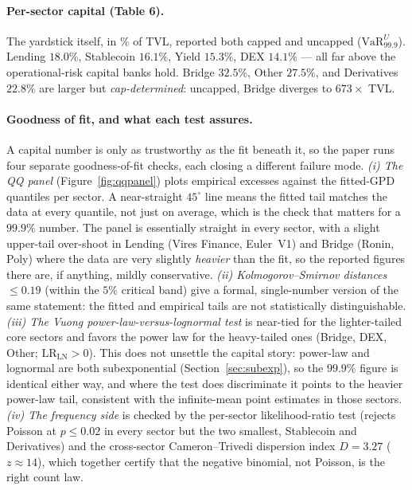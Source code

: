 \documentclass[11pt]{article}
\theoremstyle{definition}
\theoremstyle{remark}
\theoremstyle{definition}
\newcommand{\VaR}{\mathrm{VaR}}
\newcommand{\1}{\mathbf{1}}
\begin{document}
\paragraph{Per-sector capital (Table 6).}
The yardstick itself, in \% of TVL, reported both capped and uncapped
($\VaR_{99.9}^{U}$). Lending $18.0\%$, Stablecoin $16.1\%$, Yield $15.3\%$,
DEX $14.1\%$ --- all far above the operational-risk capital banks hold. Bridge
$32.5\%$, Other $27.5\%$, and Derivatives $22.8\%$ are larger but
\emph{cap-determined}: uncapped, Bridge diverges to $673\times$ TVL.

\paragraph{Goodness of fit, and what each test assures.}
A capital number is only as trustworthy as the fit beneath it, so the paper runs
four separate goodness-of-fit checks, each closing a different failure mode.
\emph{(i) The QQ panel} (Figure~\ref{fig:qqpanel}) plots empirical excesses
against the fitted-GPD quantiles per sector. A near-straight $45^\circ$ line
means the fitted tail matches the data at every quantile, not just on average,
which is the check that matters for a $99.9\%$ number. The panel is essentially
straight in every sector, with a slight upper-tail over-shoot in Lending (Vires
Finance, Euler~V1) and Bridge (Ronin, Poly) where the data are very slightly
\emph{heavier} than the fit, so the reported figures there are, if anything,
mildly conservative. \emph{(ii) Kolmogorov--Smirnov distances} $\le 0.19$ (within
the $5\%$ critical band) give a formal, single-number version of the same
statement: the fitted and empirical tails are not statistically distinguishable.
\emph{(iii) The Vuong power-law-versus-lognormal test} is near-tied for the
lighter-tailed core sectors and favors the power law for the heavy-tailed ones
(Bridge, DEX, Other; $\text{LR}_{\text{LN}}>0$). This does not unsettle the
capital story: power-law and lognormal are both subexponential
(Section~\ref{sec:subexp}), so the $99.9\%$ figure is identical either way, and
where the test does discriminate it points to the heavier power-law tail,
consistent with the infinite-mean point estimates in those sectors. \emph{(iv) The frequency side} is checked by the
per-sector likelihood-ratio test (rejects Poisson at $p\le0.02$ in every
sector but the two smallest, Stablecoin and Derivatives) and the cross-sector
Cameron--Trivedi dispersion index $D=3.27$ ($z\approx14$), which together
certify that the negative binomial, not Poisson, is the right count law.
\end{document}
